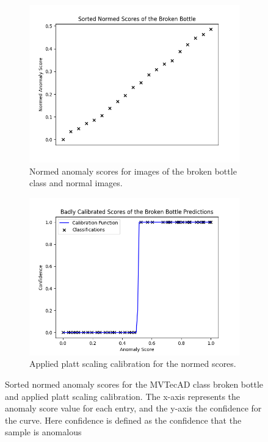 \begin{figure}[htbp]
    \centering
    \begin{subfigure}[b]{0.45\textwidth}
        \includegraphics[width=\textwidth]{figures/anomaly_scores_sorted.png}
        \caption{Normed anomaly scores for images of the broken bottle class and normal images.}
        \label{fig:scoresNormed}
    \end{subfigure}
    \begin{subfigure}[b]{0.45\textwidth}
        \includegraphics[width=\textwidth]{figures/anomaly_calibration_step.png}
        \caption{Applied platt scaling calibration for the normed scores.}
        \label{fig:platt}
    \end{subfigure}
    \caption{Sorted normed anomaly scores for the MVTecAD \cite{MVTEC_Bergmann_2021} class broken bottle and applied platt scaling calibration. The x-axis represents 
            the anomaly score value for each entry, and the y-axis the confidence for the curve. Here confidence is defined as the confidence that the sample is anomalous}
    \label{fig:badCal}
\end{figure}

